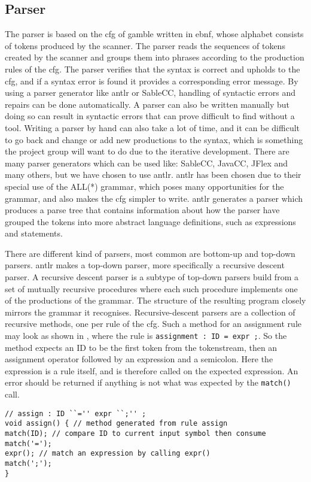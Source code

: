 \subsection*{Parser}\label{subsec:parser}
The parser is based on the \acrfull{cfg} of \gls{gamble} written in \acrfull{ebnf}, whose alphabet consists of tokens produced by the scanner.
The parser reads the sequences of tokens created by the scanner and groups them into phrases according to the production rules of the \acrshort{cfg}.
The parser verifies that the syntax is correct and upholds to the \acrshort{cfg}, and if a syntax error is found it provides a corresponding error message. \citep{Crafting_book}
By using a parser generator like \acrshort{antlr} or SableCC, handling of syntactic errors and repairs can be done automatically.
A parser can also be written manually but doing so can result in syntactic errors that can prove difficult to find without a tool.
Writing a parser by hand can also take a lot of time, and it can be difficult to go back and change or add new productions to the syntax, which is something the project group will want to do due to the iterative development.
There are many parser generators which can be used like: SableCC, JavaCC, JFlex and many others, but we have chosen to use \acrshort{antlr}.
\acrshort{antlr} has been chosen due to their special use of the ALL(*) grammar, which poses many opportunities for the grammar, and also makes the \acrshort{cfg} simpler to write.
\acrshort{antlr} generates a parser which produces a parse tree that contains information about how the parser have grouped the tokens into more abstract language definitions, such as expressions and statements.

There are different kind of parsers, most common are bottom-up and top-down parsers.
\acrshort{antlr} makes a top-down parser, more specifically a recursive descent parser.
A recursive descent parser is a subtype of top-down parsers build from a set of mutually recursive procedures where each such procedure implements one of the productions of the grammar.
The structure of the resulting program closely mirrors the grammar it recognises. \citep{Recursive_programming}
Recursive-descent parsers are a collection of recursive methods, one per rule of the \acrshort{cfg}.
Such a method for an assignment rule may look as shown in , where the rule is \texttt{assignment : ID = expr ;}.
So the method expects an ID to be the first token from the tokenstream, then an assignment operator followed by an expression and a semicolon.
Here the expression is a rule itself, and is therefore called on the expected expression.
An error should be returned if anything is not what was expected by the \texttt{match()} call.
\begin{lstlisting}[caption=Example a recursive descent parser method,frame=tlrb,label={lst:rdpmethod}]
// assign : ID ``='' expr ``;'' ;
void assign() { // method generated from rule assign
match(ID); // compare ID to current input symbol then consume
match('=');
expr(); // match an expression by calling expr()
match(';');
}
\end{lstlisting}

